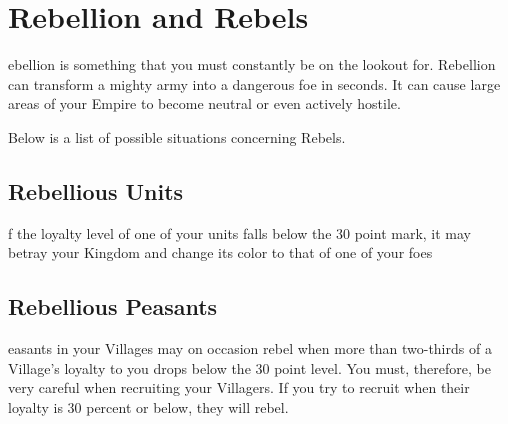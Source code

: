 
\chapter{Rebellion and Rebels}


ebellion is something that you must constantly be on the lookout for. Rebellion can transform a mighty army into a dangerous foe in seconds. It can cause large areas of your Empire to become neutral or even actively hostile.

Below is a list of possible situations concerning Rebels.

\section{Rebellious Units}


f the loyalty level of one of your units falls below the 30 point mark, it may betray your Kingdom and change its color to that of one of your foes

\section{Rebellious Peasants}



easants in your Villages may on occasion rebel when more than two-thirds of a Village’s loyalty to you drops below the 30 point level. You must, therefore, be very careful when recruiting your Villagers. If you try to recruit when their loyalty is 30 percent or below, they will rebel.

